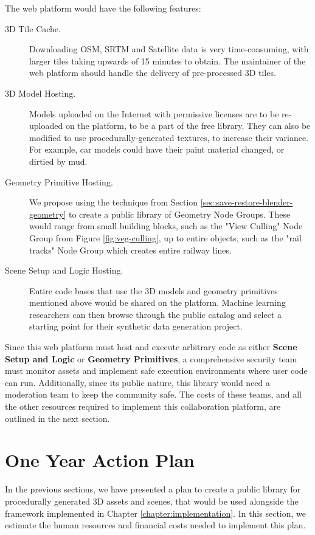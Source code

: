 The web platform would have the following features:
\begin{description}
  \item[3D Tile Cache.] Downloading OSM, SRTM and Satellite data is very time-consuming, with larger tiles taking upwards of 15 minutes to obtain. The maintainer of the web platform should handle the delivery of pre-processed 3D tiles.
  \item[3D Model Hosting.] Models uploaded on the Internet with permissive licenses are to be re-uploaded on the platform, to be a part of the free library. They can also be modified to use procedurally-generated textures, to increase their variance. For example, car models could have their paint material changed, or dirtied by mud. 
  \item[Geometry Primitive Hosting.] We propose using the technique from Section \ref{sec:save-restore-blender-geometry} to create a public library of Geometry Node Groups. These would range from small building blocks, such as the "View Culling" Node Group from Figure \ref{fig:veg-culling}, up to entire objects, such as the "rail tracks" Node Group which creates entire railway lines.
  \item[Scene Setup and Logic Hosting.] Entire code bases that use the 3D models and geometry primitives mentioned above would be shared on the platform. Machine learning researchers can then browse through the public catalog and select a starting point for their synthetic data generation project.
\end{description}


Since this web platform must host and execute arbitrary code as either \textbf{Scene Setup and Logic} or \textbf{Geometry Primitives}, a comprehensive security team must monitor assets and implement safe execution environments where user code can run. Additionally, since its public nature, this library would need a moderation team to keep the community safe. The costs of these teams, and all the other resources required to implement this collaboration platform, are outlined in the next section.

\section{One Year Action Plan}
\label{sec:future-one-year-action-plan}

In the previous sections, we have presented a plan to create a public library for procedurally generated 3D assets and scenes, that would be used alongside the framework implemented in Chapter \ref{chapter:implementation}. In this section, we estimate the human resources and financial costs needed to implement this plan.

